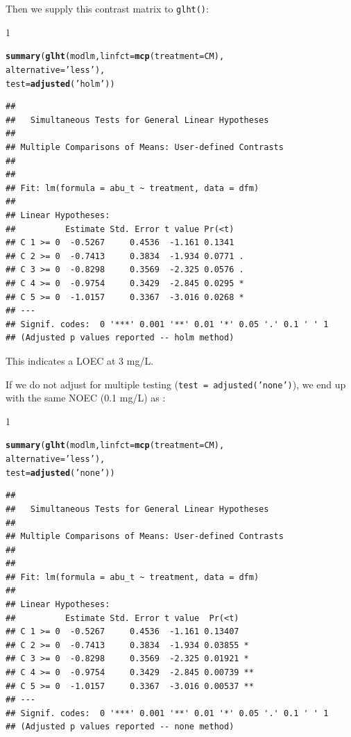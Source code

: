 \documentclass{scrartcl}\usepackage[]{graphicx}\usepackage[]{color}
\makeatletter
\newcommand{\hlstr}[1]{\textcolor[rgb]{0.192,0.494,0.8}{#1}}%
\newcommand{\hlstd}[1]{\textcolor[rgb]{0.345,0.345,0.345}{#1}}%
\newcommand{\hlkwc}[1]{\textcolor[rgb]{0.333,0.667,0.333}{#1}}%
\newcommand{\hlkwd}[1]{\textcolor[rgb]{0.737,0.353,0.396}{\textbf{#1}}}%
\newenvironment{kframe}{%
 \def\at@end@of@kframe{}%
 \ifinner\ifhmode%
  \def\at@end@of@kframe{\end{minipage}}%
  \begin{minipage}{\columnwidth}%
 \fi\fi%
 \def\FrameCommand##1{\hskip\@totalleftmargin \hskip-\fboxsep
 \colorbox{shadecolor}{##1}\hskip-\fboxsep
     \hskip-\linewidth \hskip-\@totalleftmargin \hskip\columnwidth}%
 \MakeFramed {\advance\hsize-\width
   \@totalleftmargin\z@ \linewidth\hsize
   \@setminipage}}%
 {\par\unskip\endMakeFramed%
 \at@end@of@kframe}
\newenvironment{knitrout}{}{} %
\renewenvironment{knitrout}{\begin{spacing}{1}}{\end{spacing}}
\makeatother
\begin{document}
Then we supply this contrast matrix to \texttt{glht()}:
\begin{knitrout}
\color{fgcolor}\begin{kframe}
\begin{alltt}
\hlkwd{summary}\hlstd{(}\hlkwd{glht}\hlstd{(modlm,} \hlkwc{linfct} \hlstd{=} \hlkwd{mcp}\hlstd{(}\hlkwc{treatment} \hlstd{= CM),}
             \hlkwc{alternative} \hlstd{=} \hlstr{'less'}\hlstd{),}
        \hlkwc{test} \hlstd{=} \hlkwd{adjusted}\hlstd{(}\hlstr{'holm'}\hlstd{))}
\end{alltt}
\begin{verbatim}
## 
## 	 Simultaneous Tests for General Linear Hypotheses
## 
## Multiple Comparisons of Means: User-defined Contrasts
## 
## 
## Fit: lm(formula = abu_t ~ treatment, data = dfm)
## 
## Linear Hypotheses:
##          Estimate Std. Error t value Pr(<t)  
## C 1 >= 0  -0.5267     0.4536  -1.161 0.1341  
## C 2 >= 0  -0.7413     0.3834  -1.934 0.0771 .
## C 3 >= 0  -0.8298     0.3569  -2.325 0.0576 .
## C 4 >= 0  -0.9754     0.3429  -2.845 0.0295 *
## C 5 >= 0  -1.0157     0.3367  -3.016 0.0268 *
## ---
## Signif. codes:  0 '***' 0.001 '**' 0.01 '*' 0.05 '.' 0.1 ' ' 1
## (Adjusted p values reported -- holm method)
\end{verbatim}
\end{kframe}
\end{knitrout}

This indicates a LOEC at 3 mg/L.

If we do not adjust for multiple testing (\texttt{test = adjusted('none')}), we end up with the same NOEC  (0.1 mg/L) as \citet{brock_minimum_2015}:
\begin{knitrout}
\color{fgcolor}\begin{kframe}
\begin{alltt}
\hlkwd{summary}\hlstd{(}\hlkwd{glht}\hlstd{(modlm,} \hlkwc{linfct} \hlstd{=} \hlkwd{mcp}\hlstd{(}\hlkwc{treatment} \hlstd{= CM),}
             \hlkwc{alternative} \hlstd{=} \hlstr{'less'}\hlstd{),}
        \hlkwc{test} \hlstd{=} \hlkwd{adjusted}\hlstd{(}\hlstr{'none'}\hlstd{))}
\end{alltt}
\begin{verbatim}
## 
## 	 Simultaneous Tests for General Linear Hypotheses
## 
## Multiple Comparisons of Means: User-defined Contrasts
## 
## 
## Fit: lm(formula = abu_t ~ treatment, data = dfm)
## 
## Linear Hypotheses:
##          Estimate Std. Error t value  Pr(<t)   
## C 1 >= 0  -0.5267     0.4536  -1.161 0.13407   
## C 2 >= 0  -0.7413     0.3834  -1.934 0.03855 * 
## C 3 >= 0  -0.8298     0.3569  -2.325 0.01921 * 
## C 4 >= 0  -0.9754     0.3429  -2.845 0.00739 **
## C 5 >= 0  -1.0157     0.3367  -3.016 0.00537 **
## ---
## Signif. codes:  0 '***' 0.001 '**' 0.01 '*' 0.05 '.' 0.1 ' ' 1
## (Adjusted p values reported -- none method)
\end{verbatim}
\end{kframe}
\end{knitrout}
\end{document}
